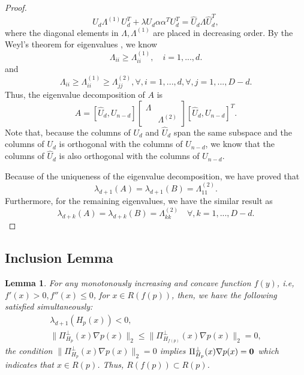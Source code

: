 \documentclass[aos,preprint]{imsart}
\newtheorem{lemma}[theorem]{Lemma}
\theoremstyle{remark}
\begin{document}
\begin{appendix}
\begin{proof}
\[
U_d\Lambda^{(1)} U_d^T+\lambda U_d \alpha \alpha^T U_d^T = \hat{U}_d {\Lambda} \hat{U}_d^T,
\]
where the diagonal elements in $\Lambda, \Lambda^{(1)}$ are placed in decreasing order. By the Weyl's theorem for eigenvalues \cite{horn2012matrix}, we know 
\[
{\Lambda}_{ii}\geq {\Lambda}_{ii}^{(1)}, \quad i=1,..., d.
\] 
and
\[
{\Lambda}_{ii}\geq {\Lambda}_{ii}^{(1)}\geq {\Lambda}_{jj}^{(2)},  \forall, i=1,..., d, \forall, j= 1,...,D-d.
\] 
Thus, the eigenvalue decomposition of $A$ is
\[
A = [\hat{U}_d, U_{n-d}] 
\left[
\begin{array}{cc}
\Lambda & \\
 & \Lambda^{(2)}
\end{array}
\right]
[\hat{U}_d, U_{n-d}]^T.
\]
Note that, because the columns of $U_d$ and $\hat{U}_d$ span the same subspace and the columns of $U_d$ is orthogonal with the columns of $U_{n-d}$, we know that the columns of $\hat{U}_d$ is also orthogonal with the columns of $U_{n-d}$.

Because of the uniqueness of the eigenvalue decomposition, we have proved that 
\[
\lambda_{d+1}(A) = \lambda_{d+1}(B) = \Lambda^{(2)}_{1 1}.
\]
Furthermore, for the remaining eigenvalues, we have the similar result as
\[
\lambda_{d+k}(A) = \lambda_{d+k}(B) = \Lambda^{(2)}_{k k}\quad \forall, k = 1,...,D-d.
\]
\end{proof}
%
\subsection{Inclusion Lemma}
\begin{lemma}{
For any monotonously increasing and concave function $f(y)$, i.e,  $f'(x)>0, f''(x) \leq 0$, for $x\in R({f(p)})$, then, we have the following satisfied simultaneously:
 \begin{gather*}
 \lambda_{d+1}(H_p(x)) < 0,\\
\|\Pi_{H_p}^\perp(x)\nabla p(x)\|_2 \leq \|\Pi_{H_{f(p)}}^{\perp}(x)\nabla p(x)\|_2=0,
\end{gather*}
the condition $\|\Pi_{H_p}^\perp(x)\nabla p(x)\|_2  =0$ implies $\Pi_{H_p}^\perp(x)\nabla p(x)=\bf 0$ which indicates that $x\in R(p)$. Thus, $R(f(p)) \subset R(p)$}. %
\label{monotonously theorem} 
\end{lemma}


\end{appendix}
\end{document}
